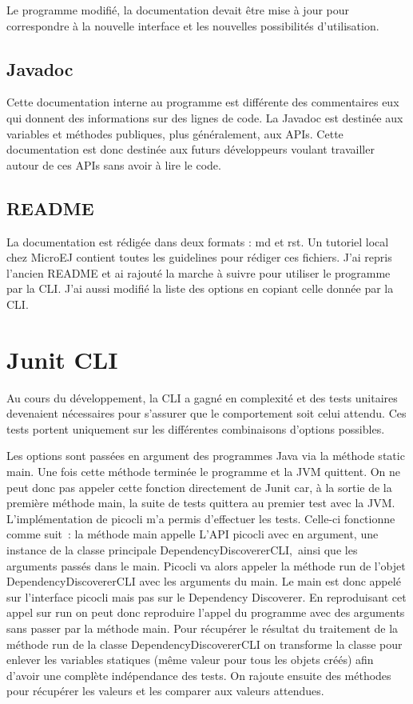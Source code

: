 \documentclass[french,a4paper,12pt]{report}
\begin{document}
Le programme modifié, la documentation devait être mise à jour pour correspondre à la nouvelle interface et les nouvelles possibilités d’utilisation.

\subsection{Javadoc}

Cette documentation interne au programme est différente des commentaires eux qui donnent des informations sur des lignes de code. La Javadoc est destinée aux variables et méthodes publiques, plus généralement, aux APIs. Cette documentation est donc destinée aux futurs développeurs voulant travailler autour de ces APIs sans avoir à lire le code.

\subsection{README}

La documentation est rédigée dans deux formats : md et rst. Un tutoriel local chez MicroEJ contient toutes les guidelines pour rédiger ces fichiers. J'ai repris l'ancien README et ai rajouté la marche à suivre pour utiliser le programme par la CLI. J'ai aussi modifié la liste des options en copiant celle donnée par la CLI. 

\section{Junit CLI}

Au cours du développement, la CLI a gagné en complexité et des tests unitaires devenaient nécessaires pour s’assurer que le comportement soit celui attendu. Ces tests portent uniquement sur les différentes combinaisons d’options possibles. 

Les options sont passées en argument des programmes Java via la méthode static main. Une fois cette méthode terminée le programme et la JVM quittent. On ne peut donc pas appeler cette fonction directement de Junit car, à la sortie de la première méthode main, la suite de tests quittera au premier test avec la JVM. 
L’implémentation de picocli m’a permis d’effectuer les tests. Celle-ci fonctionne comme suit : la méthode main appelle L’API picocli avec en argument, une instance de la classe principale DependencyDiscovererCLI, ainsi que les arguments passés dans le main.
Picocli va alors appeler la méthode run de l'objet DependencyDiscovererCLI avec les arguments du main. Le main est donc appelé sur l'interface picocli mais pas sur le Dependency Discoverer.
En reproduisant cet appel sur run on peut donc reproduire l’appel du programme avec des arguments sans passer par la méthode main.
Pour récupérer le résultat du traitement de la méthode run de la classe DependencyDiscovererCLI on transforme la classe pour enlever les variables statiques (même valeur pour tous les objets créés) afin d’avoir une complète indépendance des tests. On rajoute ensuite des méthodes pour récupérer les valeurs et les comparer aux valeurs attendues.
\end{document}
